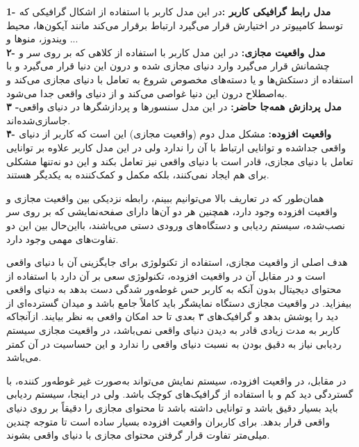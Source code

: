 \textbf{1- مدل رابط گرافیکی کاربر :}در این مدل کاربر با استفاده از اشکال گرافیکی که توسط کامپیوتر در اختیارش قرار می‌گیرد ارتباط برقرار می‌کند مانند آیکون‌ها، محیط ویندوز، منوها و ...
\\
\textbf{
	۲- مدل واقعیت مجازی: }در این مدل کاربر با استفاده از کلاهی که بر روی سر و چشمانش قرار می‌گیرد وارد دنیای مجازی شده و درون این دنیا قرار می‌گیرد و با استفاده از دستکش‌ها و یا دسته‌های مخصوص شروع به تعامل با دنیای مجازی می‌کند و به‌اصطلاح درون این دنیا غواصی می‌کند و از دنیای واقعی جدا می‌شود.
\\
\textbf{۳ -مدل پردازش همه‌جا حاضر: }در این مدل سنسورها و پردازشگرها در دنیای واقعی جاسازی‌شده‌اند.
\\
\textbf{
	۴- واقعیت افزوده:} مشکل مدل دوم (واقعیت مجازی) این است که کاربر از دنیای واقعی جداشده و توانایی ارتباط با آن را ندارد ولی در این مدل کاربر علاوه بر توانایی تعامل با دنیای مجازی، قادر است با دنیای واقعی نیز تعامل بکند و این دو نه‌تنها مشکلی برای هم ایجاد نمی‌کنند، بلکه مکمل و کمک‌کننده به یکدیگر هستند.

همان‌طور که در تعاریف بالا می‌توانیم ببینم، رابطه نزدیکی بین واقعیت مجازی و واقعیت افزوده وجود دارد، همچنین هر دو آن‌ها دارای صفحه‌نمایشی که بر روی سر نصب‌شده، سیستم ردیابی و دستگاه‌های ورودی دستی می‌باشند، بااین‌حال بین این دو تفاوت‌های مهمی وجود دارد.

هدف اصلی از واقعیت مجازی، استفاده از تکنولوژی برای جایگزینی آن با دنیای واقعی است و در مقابل آن در واقعیت افزوده، تکنولوژی سعی بر آن دارد  با استفاده از محتوای دیجیتال بدون آنکه به کاربر حس غوطه‌ور شدگی دست بدهد به دنیای واقعی بیفزاید. در واقعیت مجازی دستگاه نمایشگر باید کاملاً جامع باشد و میدان گسترده‌ای از دید را پوشش بدهد و گرافیک‌های ۳ بعدی تا حد امکان واقعی به نظر بیایند. ازآنجاکه کاربر به مدت زیادی قادر به دیدن دنیای واقعی نمی‌باشد، در واقعیت مجازی سیستم ردیابی نیاز به دقیق بودن به نسبت دنیای واقعی را ندارد و این حساسیت در آن کمتر می‌باشد.

در مقابل، در  واقعیت افزوده، سیستم نمایش می‌تواند به‌صورت غیر غوطه‌ور کننده، با گستردگی دید کم و با استفاده از گرافیک‌های کوچک باشد. ولی در اینجا، سیستم ردیابی باید بسیار دقیق باشد و توانایی داشته باشد تا محتوای مجازی را دقیقاً بر روی دنیای واقعی قرار بدهد. برای کاربران واقعیت افزوده بسیار ساده است تا متوجه چندین میلی‌متر تفاوت قرار گرفتن محتوای مجازی با دنیای واقعی بشوند.

